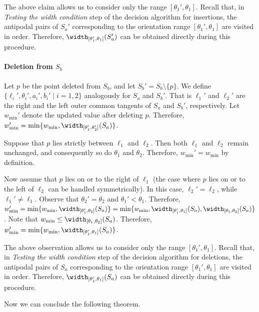 The above claim allows us to consider only the range $[\theta_1', \theta_1]$. 
Recall that, in \emph{Testing the width condition} step of the decision algorithm for insertions, the antipodal pairs of $S_a'$ corresponding to the orientation range $[\theta_1', \theta_1]$ are visited in order.
Therefore, $\width_{[\theta_1', \theta_1]}(S_a')$ can be obtained directly during this procedure.




\paragraph*{Deletion from $S_b$}
Let $p$ be the point deleted from $S_b$, and let $S_b' = S_b \setminus \{p\}$.
We define $\{\ell_i', \theta_i', a_i', b_i' \mid i=1, 2 \}$ analogously for $S_a$ and $S_b'$. 
That is $\ell_1'$ and $\ell_2'$ are the right and the left outer common tangents of $S_a$ and $S_b'$, respectively. 
Let $w_{\min}'$ denote the updated value after deleting $p$.
Therefore, $w_{\min}' = \min \{w_{\min}, \width_{[\theta_1', \theta_2']}(S_a)\}$.


Suppose that $p$ lies strictly between $\ell_1$ and $\ell_2$. 
Then both $\ell_1$ and $\ell_2$ remain unchanged, and consequently so do $\theta_1$ and $\theta_2$.
Therefore, $w_{\min}' = w_{\min}$ by definition. 



Now assume that $p$ lies on or to the right of $\ell_1$ (the case where $p$ lies on or to the left of $\ell_2$ can be handled symmetrically).
In this case, $\ell_2' = \ell_2$, while $\ell_1' \neq \ell_1$.
Observe that $\theta_2' = \theta_2$ and $\theta_1' < \theta_1$.
Therefore, $w_{\min}' = \min \{w_{\min}, \width_{[\theta_1', \theta_2]}(S_a)\} =  \min \{w_{\min}, \width_{[\theta_1', \theta_1]}(S_a), \width_{[\theta_1, \theta_2]}(S_a)\}$.
Note that $w_{\min} \le \width_{[\theta_1, \theta_2]}(S_a) $. 
Therefore, $w_{\min}' = \min \{w_{\min}, \width_{[\theta_1', \theta_1]}(S_a) \}$.


The above observation allows us to consider only the range $[\theta_1', \theta_1]$. 
Recall that, in \emph{Testing the width condition} step of the decision algorithm for deletions, the antipodal pairs of $S_a$ corresponding to the orientation range $[\theta_1', \theta_1]$ are visited in order.
Therefore, $\width_{[\theta_1', \theta_1]}(S_a)$ can be obtained directly during this procedure.

Now we can conclude the following theorem. 

